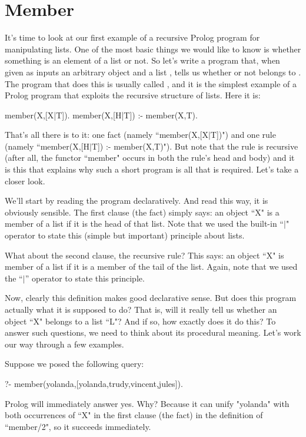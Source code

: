 \section{Member}\label{SEC.L4.MEMBER}

It's time to look at our first example of a recursive Prolog program
for manipulating lists.  One of the most basic things we would like to
know is whether something is an element of a list or not.  So let's
write a program that, when given as inputs an arbitrary object
 and a list , tells us whether or not
 belongs to .  The program that does this is
usually called , and it is the simplest example of a
Prolog program that exploits the recursive structure of lists.  Here
it is:


\begin{LPNcodedisplay}
member(X,[X|T]).
member(X,[H|T]) :- member(X,T).
\end{LPNcodedisplay}


That's all there is to it: one fact (namely ``member(X,[X$|$T])")
and one rule (namely ``member(X,[H$|$T]) :- member(X,T)"). But note
that the rule is recursive (after all, the functor ``member"
occurs in both the rule's head and body) and it is this that explains
why such a short program is all that is required.
Let's take a closer look.

We'll start by reading the program declaratively. And read this way,
it is obviously sensible.  The first clause (the fact) simply says: an
object ``X" is a member of a list if it is the head of that list.
Note that we used the built-in ``$|$" operator to state this (simple
but important) principle about lists.

What about the second clause, the recursive rule?  This says: an
object ``X" is member of a list if it is a member of the tail of
the list.  Again, note that we used the  ``$|$'' operator to state
this principle.

Now, clearly this definition makes good declarative sense.  But does
this program actually  what it is supposed to do?  That is,
will it really tell us whether an object ``X" belongs to a list
``L"? And if so, how exactly does it do this?  To answer such
questions, we need to think about its procedural meaning.  Let's work
our way through a few examples.

Suppose we posed the following query:

\begin{LPNcodedisplay}
?- member(yolanda,[yolanda,trudy,vincent,jules]).
\end{LPNcodedisplay}
Prolog will immediately answer yes.  Why?  Because it can unify
"yolanda" with both occurrences of ``X" in the first clause
(the fact) in the definition of ``member/2", so it succeeds
immediately.

